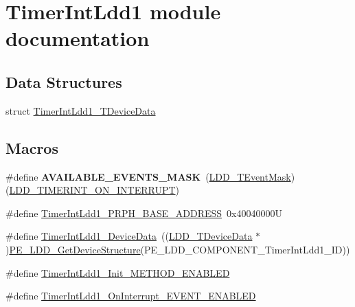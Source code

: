 \hypertarget{group___timer_int_ldd1__module}{\section{Timer\-Int\-Ldd1 module documentation}
\label{group___timer_int_ldd1__module}
}
\subsection*{Data Structures}
\begin{DoxyCompactItemize}
\item 
struct \hyperlink{struct_timer_int_ldd1___t_device_data}{Timer\-Int\-Ldd1\-\_\-\-T\-Device\-Data}
\end{DoxyCompactItemize}
\subsection*{Macros}
\begin{DoxyCompactItemize}
\item 
\hypertarget{group___timer_int_ldd1__module_ga5f04a8830cd52a3ffa1678d113f31aee}{\#define {\bfseries A\-V\-A\-I\-L\-A\-B\-L\-E\-\_\-\-E\-V\-E\-N\-T\-S\-\_\-\-M\-A\-S\-K}~(\hyperlink{group___p_e___types__module_gafbe7f4d4e51560399c3bdd0218584533}{L\-D\-D\-\_\-\-T\-Event\-Mask})(\hyperlink{group___p_e___types__module_gad4a95a8e3f3036e88f99c792431b4d72}{L\-D\-D\-\_\-\-T\-I\-M\-E\-R\-I\-N\-T\-\_\-\-O\-N\-\_\-\-I\-N\-T\-E\-R\-R\-U\-P\-T})}\label{group___timer_int_ldd1__module_ga5f04a8830cd52a3ffa1678d113f31aee}

\item 
\#define \hyperlink{group___timer_int_ldd1__module_gafb6b69926d7c31c7571ad3d945251067}{Timer\-Int\-Ldd1\-\_\-\-P\-R\-P\-H\-\_\-\-B\-A\-S\-E\-\_\-\-A\-D\-D\-R\-E\-S\-S}~0x40040000\-U
\item 
\#define \hyperlink{group___timer_int_ldd1__module_ga5029b1a3ee62b1e77252cb5ee432e572}{Timer\-Int\-Ldd1\-\_\-\-Device\-Data}~((\hyperlink{group___p_e___types__module_gac5cf1362f1f0e3a2ce71b1bf2276d091}{L\-D\-D\-\_\-\-T\-Device\-Data} $\ast$)\hyperlink{group___p_e___types__module_gaa1c23d559daef5bcd3327ca83fb56f5a}{P\-E\-\_\-\-L\-D\-D\-\_\-\-Get\-Device\-Structure}(P\-E\-\_\-\-L\-D\-D\-\_\-\-C\-O\-M\-P\-O\-N\-E\-N\-T\-\_\-\-Timer\-Int\-Ldd1\-\_\-\-I\-D))
\item 
\#define \hyperlink{group___timer_int_ldd1__module_ga99f1a84b931818260bb4dfad5d071136}{Timer\-Int\-Ldd1\-\_\-\-Init\-\_\-\-M\-E\-T\-H\-O\-D\-\_\-\-E\-N\-A\-B\-L\-E\-D}
\item 
\#define \hyperlink{group___timer_int_ldd1__module_ga97ee83f24ca8c5f570d5be8bdc0c6dde}{Timer\-Int\-Ldd1\-\_\-\-On\-Interrupt\-\_\-\-E\-V\-E\-N\-T\-\_\-\-E\-N\-A\-B\-L\-E\-D}
\end{DoxyCompactItemize}
